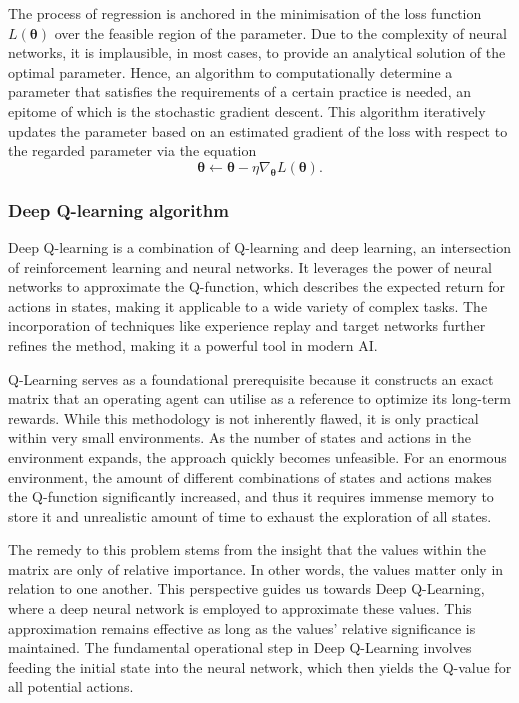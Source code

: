 \documentclass[11pt,twoside]{article}
\numberwithin{Theorem}{section}
\numberwithin{Definition}{section}
\numberwithin{Lemma}{section}
\numberwithin{Algorithm}{section}
\numberwithin{equation}{section}
\begin{document}
The process of regression is anchored in the minimisation of the loss function $L(\boldsymbol{\theta})$ over the feasible region of the parameter. Due to the complexity of neural networks, it is implausible, in most cases, to provide an analytical solution of the optimal parameter. Hence, an algorithm to computationally determine a parameter that satisfies the requirements of a certain practice is needed, an epitome of which is the stochastic gradient descent. This algorithm iteratively updates the parameter based on an estimated gradient of the loss with respect to the regarded parameter via the equation
$$\boldsymbol{\theta}\leftarrow\boldsymbol{\theta}-\eta\nabla_{\boldsymbol{\theta}}L(\boldsymbol{\theta}).$$

\subsubsection{Deep Q-learning algorithm}
Deep Q-learning is a combination of Q-learning and deep learning, an intersection of reinforcement learning and neural networks. It leverages the power of neural networks to approximate the Q-function, which describes the expected return for actions in states, making it applicable to a wide variety of complex tasks. The incorporation of techniques like experience replay and target networks further refines the method, making it a powerful tool in modern AI.

Q-Learning serves as a foundational prerequisite because it constructs an exact matrix that an operating agent can utilise as a reference to optimize its long-term rewards. While this methodology is not inherently flawed, it is only practical within very small environments. As the number of states and actions in the environment expands, the approach quickly becomes unfeasible. For an enormous environment, the amount of different combinations of states and actions makes the Q-function significantly increased, and thus it requires immense memory to store it and unrealistic amount of time to exhaust the exploration of all states.

The remedy to this problem stems from the insight that the values within the matrix are only of relative importance. In other words, the values matter only in relation to one another. This perspective guides us towards Deep Q-Learning, where a deep neural network is employed to approximate these values. This approximation remains effective as long as the values' relative significance is maintained. The fundamental operational step in Deep Q-Learning involves feeding the initial state into the neural network, which then yields the Q-value for all potential actions.
\end{document}
